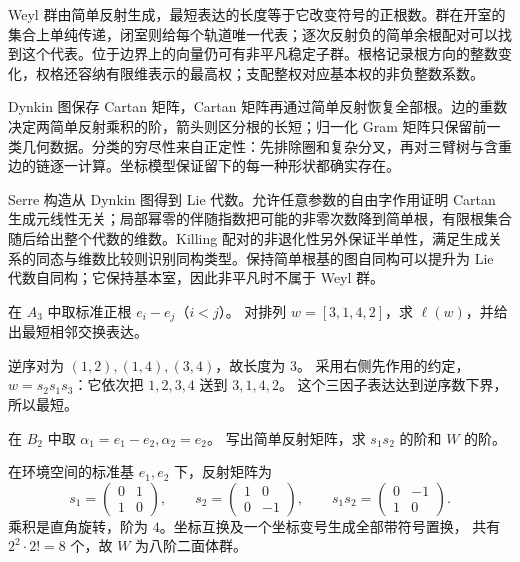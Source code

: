 \begin{chaptersummary}
	Weyl 群由简单反射生成，最短表达的长度等于它改变符号的正根数。群在开室的集合上单纯传递，闭室则给每个轨道唯一代表；逐次反射负的简单余根配对可以找到这个代表。位于边界上的向量仍可有非平凡稳定子群。根格记录根方向的整数变化，权格还容纳有限维表示的最高权；支配整权对应基本权的非负整数系数。

	\ProseParagraphBreak

	Dynkin 图保存 Cartan 矩阵，Cartan 矩阵再通过简单反射恢复全部根。边的重数决定两简单反射乘积的阶，箭头则区分根的长短；归一化 Gram 矩阵只保留前一类几何数据。分类的穷尽性来自正定性：先排除圈和复杂分叉，再对三臂树与含重边的链逐一计算。坐标模型保证留下的每一种形状都确实存在。

	\ProseParagraphBreak

	Serre 构造从 Dynkin 图得到 Lie 代数。允许任意参数的自由字作用证明 Cartan 生成元线性无关；局部幂零的伴随指数把可能的非零次数降到简单根，有限根集合随后给出整个代数的维数。Killing 配对的非退化性另外保证半单性，满足生成关系的同态与维数比较则识别同构类型。保持简单根基的图自同构可以提升为 Lie 代数自同构；它保持基本室，因此非平凡时不属于 Weyl 群。
\end{chaptersummary}

\BookExercises

\begin{exercise}\label{b5:ex:17-s4-length}
	在 \(A_3\) 中取标准正根 \(e_i-e_j\)（\(i<j\)）。 对排列 \(w=[3,1,4,2]\)，求 \(\ell(w)\)，并给出最短相邻交换表达。
\end{exercise}
\begin{solution}
	逆序对为 \((1,2),(1,4),(3,4)\)，故长度为 \(3\)。 采用右侧先作用的约定， \(w=s_2s_1s_3\)：它依次把 \(1,2,3,4\) 送到 \(3,1,4,2\)。 这个三因子表达达到逆序数下界，所以最短。
\end{solution}

\begin{exercise}\label{b5:ex:17-b2-weyl}
	在 \(B_2\) 中取 \(\alpha_1=e_1-e_2,\alpha_2=e_2\)。 写出简单反射矩阵，求 \(s_1s_2\) 的阶和 \(W\) 的阶。
\end{exercise}
\begin{solution}
	在环境空间的标准基 \(e_1,e_2\) 下，反射矩阵为
	\[
		s_1=\begin{pmatrix}0&1\\1&0\end{pmatrix},\qquad
		s_2=\begin{pmatrix}1&0\\0&-1\end{pmatrix},\qquad
		s_1s_2=\begin{pmatrix}0&-1\\1&0\end{pmatrix}.
	\]
	乘积是直角旋转，阶为 \(4\)。坐标互换及一个坐标变号生成全部带符号置换， 共有 \(2^2\cdot2!=8\) 个，故 \(W\) 为八阶二面体群。
\end{solution}

